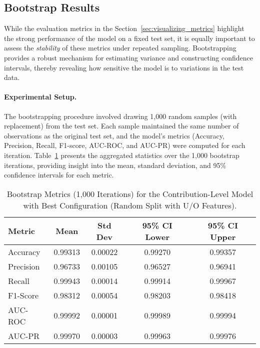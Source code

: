 \documentclass[
    13pt, %
    a4paper, %
    listof=totoc, %
    bibliography=totoc, %
    index=totoc, %
    headsepline
]{scrreprt}
\begin{document}
\subsection{Bootstrap Results}
\label{sec:bootstrap_best_model}

While the evaluation metrics in the Section~\ref{sec:visualizing_metrics} highlight the strong performance of the model on a fixed test set, it is equally important to assess the \emph{stability} of these metrics under repeated sampling. Bootstrapping provides a robust mechanism for estimating variance and constructing confidence intervals, thereby revealing how sensitive the model is to variations in the test data.

\paragraph{Experimental Setup.}
The bootstrapping procedure involved drawing 1{,}000 random samples (with replacement) from the test set. Each sample maintained the same number of observations as the original test set, and the model’s metrics (Accuracy, Precision, Recall, F1-score, AUC-ROC, and AUC-PR) were computed for each iteration. Table~\ref{tab:bootstrap_metrics} presents the aggregated statistics over the 1{,}000 bootstrap iterations, providing insight into the mean, standard deviation, and 95\% confidence intervals for each metric.

\begin{table}[H]
    \centering
    \caption{Bootstrap Metrics (1,000 Iterations) for the Contribution-Level Model with Best Configuration (Random Split with U/O Features).}
    \vspace{1em}
    \label{tab:bootstrap_metrics}
    \begin{tabular}{lcccc}
    \toprule
    \textbf{Metric} & \textbf{Mean} & \textbf{Std Dev} & \textbf{95\% CI Lower} & \textbf{95\% CI Upper} \\
    \midrule
    Accuracy  & 0.99313 & 0.00022 & 0.99270 & 0.99357 \\
    Precision & 0.96733 & 0.00105 & 0.96527 & 0.96941 \\
    Recall    & 0.99943 & 0.00014 & 0.99914 & 0.99967 \\
    F1-Score  & 0.98312 & 0.00054 & 0.98203 & 0.98418 \\
    AUC-ROC   & 0.99992 & 0.00001 & 0.99989 & 0.99994 \\
    AUC-PR    & 0.99970 & 0.00003 & 0.99963 & 0.99976 \\
    \bottomrule
    \end{tabular}
\end{table}
\end{document}
